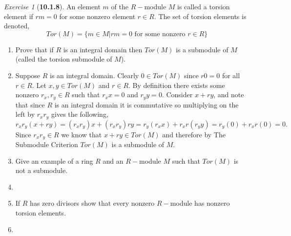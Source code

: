 \documentclass[12pt]{amsart}
\makeatletter
\theoremstyle{remark}
\newtheorem*{exercise}{Exercise}%
\renewenvironment{proof}[1][\proofname]{\par\doublespacing
  \pushQED{\qed}%
  \normalfont \topsep6\p@\@plus6\p@\relax
  \list{}{%
    \settowidth{\leftmargin}{\itshape\proofname:\hskip\labelsep}%
    \setlength{\labelwidth}{0pt}%
    \setlength{\itemindent}{-\leftmargin}%
  }%
  \item[\hskip\labelsep\itshape#1\@addpunct{:}]\ignorespaces
}{%
  \popQED\endlist\@endpefalse
  \singlespacing
}
\theoremstyle{mycomment}
\makeatother
\begin{document}
\begin{exercise}[\textbf{10.1.8}] An element $m$ of the $R-$module $M$ is called a torsion element if $rm = 0$ for some 
  nonzero element $r \in R$. The set of torsion elements is denoted, 
  \begin{equation*}
    Tor(M) = \{m \in M | rm = 0 \text{ for some nonzero  }r \in R\}
  \end{equation*}
  \begin{proof}
    \begin{enumerate}
      \item[(a)] Prove that if $R$ is an integral domain then $Tor(M)$ is a submodule of $M$ (called the torsion submodule of $M$). 
      \begin{proof} Suppose $R$ is an integral domain. Clearly $0 \in Tor(M)$ since $r0 = 0$ for all $r \in R$. Let $x, y \in Tor(M)$
        and $r \in R$. By definition there exists some nonzero $r_x, r_y \in R$ such that $r_xx = 0$ and $r_yy = 0$. Consider 
        $x + ry$, and note that since $R$ is an integral domain it is commutative so multiplying on the left by $r_xr_y$ gives the following, 
        \begin{equation*}
          r_xr_y(x + ry) = (r_xr_y)x + (r_xr_y)ry =  r_y(r_xx) + r_xr(r_yy) = r_y(0) + r_xr(0) = 0. 
        \end{equation*}
        Since $r_xr_y \in R$ we know that $x + ry \in Tor(M)$ and therefore by The Submodule Criterion $Tor(M)$ is a submodule of $M$. 
      \end{proof} 
    \vspace{.15in}

    \item[(b)] Give an example of a ring $R$ and an $R-$module $M$ such that $Tor(M)$ is not a submodule. 
    \begin{proof} 

     \end{proof} 
  \vspace{.15in}


  \item[(c)] If $R$ has zero divisors show that every nonzero $R-$module has nonzero torsion elements.  
  \begin{proof} 

    \end{proof} 
    \end{enumerate}
  \end{proof}
\end{exercise}
\vspace{.5in}
\end{document}
